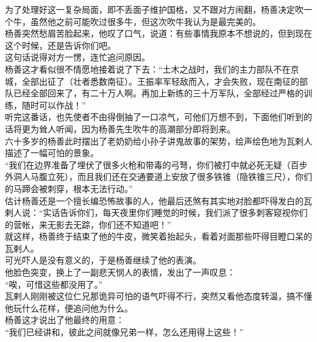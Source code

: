 \begin{multicols}{\theparacolNo}
为了处理好这一复杂局面，即不丢面子维护国格，又不跟对方闹翻，杨善决定吹一个牛，虽然他之前可能吹过很多牛，但这次吹牛我认为是最完美的。\\

杨善突然愁眉苦脸起来，他叹了口气，说道：有些事情我原本不想说的，但到现在这个时候，还是告诉你们吧。\\

这句话说得对方一愣，连忙追问原因。\\

杨善这才看似很不情愿地接着说了下去：“土木之战时，我们的主力部队不在京城，全部出征了（壮者悉数南征）。王振率军轻敌而入，才会失败，现在南征的部队已经全部回来了，有二十万人啊。再加上新练的三十万军队，全部经过严格的训练，随时可以作战！”\\

听完这番话，也先使者不由得倒抽了一口凉气，可他们万想不到，下面他们听到的话将更为耸人听闻，因为杨善先生吹牛的高潮部分即将到来。\\

六十多岁的杨善此时摆出了老奶奶给小孙子讲鬼故事的架势，绘声绘色地为瓦剌人描述了一幅可怕的景象。\\

“我们在边界准备了埋伏了很多火枪和带毒的弓弩，你们被打中就必死无疑（百步外洞人马腹立死），而且我们还在交通要道上安放了很多铁锥（隐铁锥三尺），你们的马蹄会被刺穿，根本无法行动。”\\

估计杨善还是一个擅长编恐怖故事的人，他最后还煞有其实地对脸都吓得发白的瓦剌人说：“实话告诉你们，每天夜里你们睡觉的时候，我们派了很多刺客窥视你们的营帐，来无影去无踪，你们还不知道吧！”\\

就这样，杨善终于结束了他的牛皮，微笑着抬起头，看着对面那些吓得目瞪口呆的瓦剌人。\\

可光吓人是没有意义的，于是杨善继续了他的表演。\\

他脸色突变，换上了一副悲天悯人的表情，发出了一声叹息：\\

“唉，可惜这些都没用了。”\\

瓦剌人刚刚被这位仁兄那诡异可怕的语气吓得不行，突然又看他态度转温，搞不懂他玩什么花样，便追问他为什么。\\

杨善这才说出了他最终的用意：\\

“我们已经讲和，彼此之间就像兄弟一样，怎么还用得上这些！”\\


\end{multicols}
